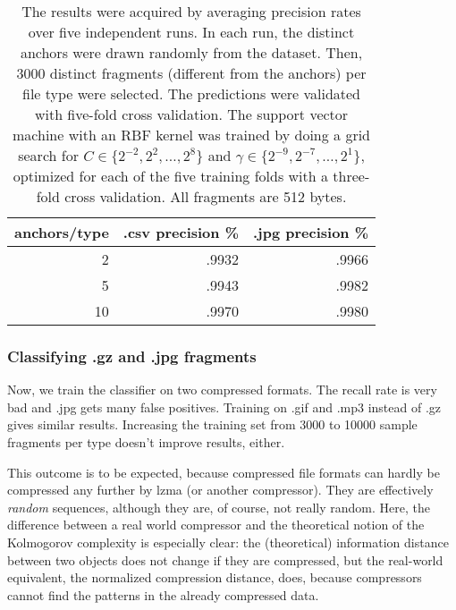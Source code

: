 \begin{table}[h]
\begin{tabular}{rrr}
\hline
   anchors/type &   .csv precision \% &   .jpg precision \% \\
\hline
              2 &           .9932 &           .9966 \\
              5 &           .9943 &           .9982 \\
              10 &          .9970 &           .9980 \\
\hline
\end{tabular}
\caption{
The results were acquired by averaging precision rates over five
independent runs. In each run, the distinct anchors were drawn randomly from the dataset.
Then, 3000 distinct fragments (different from the anchors) per file type were selected.
The predictions were validated with five-fold cross validation.
The support vector machine with an RBF kernel was trained by doing a grid search
for $C \in \{ 2^{-2}, 2^{2}, \dots, 2^{8} \}$ and $\gamma \in \{2^{-9},
2^{-7}, \dots, 2^{1} \}$, optimized for each of the five training folds with a three-fold
cross validation. All fragments are 512 bytes.}
\label{table:csv_jpg_recall}
\end{table}

\subsubsection{Classifying .gz and .jpg fragments}

Now, we train the classifier on two compressed formats. The recall rate is
very bad and .jpg gets many false positives. Training on .gif and .mp3
instead of .gz gives similar results. Increasing the training set from 3000 to 10000 sample fragments per type doesn't improve results, either.

This outcome is to be expected, because compressed file formats can hardly be compressed any further by lzma (or another compressor). They are effectively \emph{random} sequences, although they are, of course, not really random. Here, the difference between a real world compressor and the theoretical notion of the Kolmogorov complexity is especially clear: the (theoretical) information distance between two objects does not change if they are compressed, but the real-world equivalent, the normalized compression distance, does, because compressors cannot find the patterns in the already compressed data.

